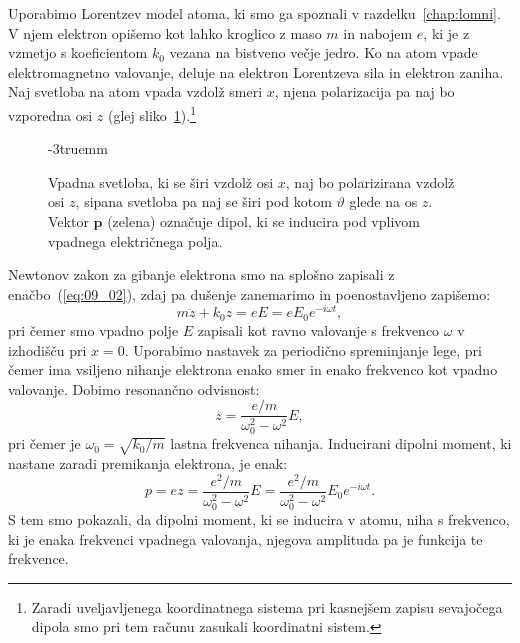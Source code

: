 Uporabimo Lorentzev model atoma, ki smo ga spoznali v razdelku~\ref{chap:lomni}.
V njem elektron opišemo kot lahko kroglico z maso $m$ in nabojem $e$, ki je z vzmetjo 
s koeficientom $k_0$ vezana na bistveno večje jedro. Ko
na atom vpade elektromagnetno valovanje, deluje na elektron 
Lorentzeva sila in elektron zaniha. Naj svetloba na atom vpada vzdolž 
smeri $x$, njena polarizacija pa naj bo vzporedna osi $z$ 
(glej sliko~\ref{fig:07_koor2}).\footnote{Zaradi uveljavljenega koordinatnega sistema
pri kasnejšem zapisu sevajočega dipola smo pri tem računu zasukali koordinatni sistem.}
\begin{figure}[!ht]
\centering
\def\svgwidth{90truemm} 

\caption{Vpadna svetloba, ki se širi vzdolž osi $x$, naj bo polarizirana vzdolž
osi $z$, sipana svetloba pa naj se širi pod kotom $\vartheta$ glede na os $z$. Vektor 
$\mathbf{p}$ (zelena) označuje dipol, ki se inducira pod vplivom vpadnega električnega 
polja.}
\label{fig:07_koor2}
\vglue-3truemm
\end{figure}

Newtonov zakon za gibanje elektrona smo na splošno zapisali z enačbo~(\ref{eq:09_02}), 
zdaj pa dušenje zanemarimo in poenostavljeno zapišemo:
\begin{equation}
m \ddot{z} + k_0 z = e E = e E_0 e^{-i\omega t},
\label{eq:07_50}
\end{equation}
pri čemer smo vpadno polje $E$ zapisali kot ravno valovanje s frekvenco $\omega$ v
izhodišču pri $x=0$. 
Uporabimo nastavek za periodično spreminjanje lege, pri čemer ima vsiljeno 
nihanje elektrona enako smer in enako frekvenco kot vpadno valovanje. Dobimo resonančno odvisnost:
\begin{equation}
z = \frac{e/m}{\omega_0^2-\omega^2}E,
\label{eq:07_51}
\end{equation}
pri čemer je $\omega_0 = \sqrt{k_0/m}$ lastna frekvenca nihanja.
Inducirani dipolni moment, ki nastane zaradi premikanja elektrona, 
je enak:
\begin{equation}
p = ez  = \frac{e^2/m}{\omega_0^2-\omega^2} E = 
\frac{e^2/m}{\omega_0^2-\omega^2}E_0 e^{-i\omega t}.
\label{eq:07_52}
\end{equation}
S tem smo pokazali, da dipolni moment, ki se inducira v atomu, niha s frekvenco, 
ki je enaka frekvenci vpadnega valovanja, njegova amplituda pa je funkcija te frekvence.

